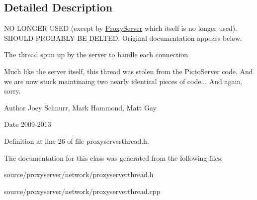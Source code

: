 \subsection{Detailed Description}
N\-O L\-O\-N\-G\-E\-R U\-S\-E\-D (except by \hyperlink{class_proxy_server}{Proxy\-Server} which itself is no longer used). S\-H\-O\-U\-L\-D P\-R\-O\-B\-A\-B\-L\-Y B\-E D\-E\-L\-T\-E\-D. Original documentation appears below. 

The thread spun up by the server to handle each connection

Much like the server itself, this thread was stolen from the Picto\-Server code. And we are now stuck maintinaing two nearly identical pieces of code... And again, sorry. \begin{DoxyAuthor}{Author}
Joey Schnurr, Mark Hammond, Matt Gay 
\end{DoxyAuthor}
\begin{DoxyDate}{Date}
2009-\/2013 
\end{DoxyDate}


Definition at line 26 of file proxyserverthread.\-h.



The documentation for this class was generated from the following files\-:\begin{DoxyCompactItemize}
\item 
source/proxyserver/network/proxyserverthread.\-h\item 
source/proxyserver/network/proxyserverthread.\-cpp\end{DoxyCompactItemize}
